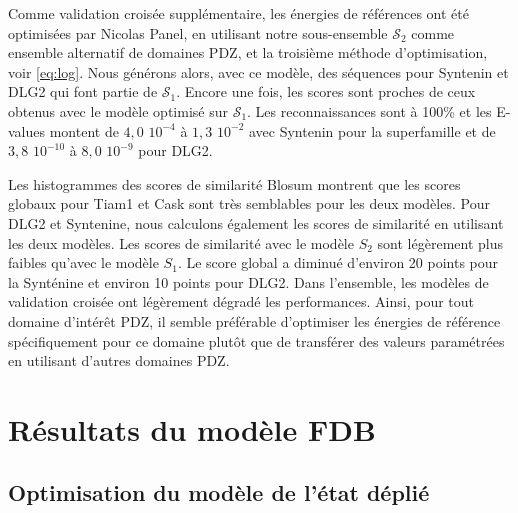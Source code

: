 Comme validation croisée supplémentaire, les énergies de références ont été optimisées par Nicolas Panel, en utilisant notre sous-ensemble $\mathcal{S}_2$ comme ensemble alternatif de domaines PDZ, et la troisième méthode d'optimisation, voir \ref{eq:log}. Nous générons alors, avec ce modèle, des séquences pour Syntenin et DLG2 qui font partie de $\mathcal{S}_1$. Encore une fois, les scores sont proches de ceux obtenus avec le modèle optimisé sur $\mathcal{S}_1$. Les reconnaissances sont à 100\% et les E-values montent de $4,0$ $10^{-4}$  à $1,3$ $10^{-2}$  avec Syntenin pour la superfamille et de $3,8$ $10^{-10}$  à $8,0$ $10^{-9}$ pour DLG2.

Les histogrammes des scores de similarité Blosum montrent que les scores globaux pour Tiam1 et Cask sont très semblables pour les deux modèles. Pour DLG2 et Syntenine, nous calculons également les scores de similarité en utilisant les deux modèles. Les scores de similarité avec le modèle $S_2$  sont légèrement plus faibles qu'avec le modèle $S_1$. Le score global a diminué d'environ 20 points pour la Synténine et environ 10 points pour DLG2. Dans l'ensemble, les modèles de validation croisée ont légèrement dégradé les performances. Ainsi, pour tout domaine d'intérêt PDZ, il semble préférable d'optimiser les énergies de référence spécifiquement pour ce domaine plutôt que de transférer des valeurs paramétrées en utilisant d'autres domaines PDZ. 

\section{Résultats du modèle FDB}

\subsection{Optimisation du modèle de l'état déplié}

